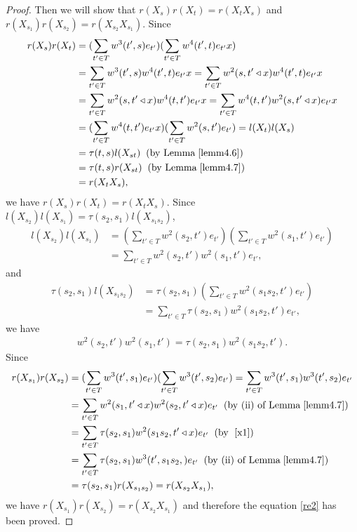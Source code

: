 \documentclass[a4paper,11pt]{amsart}
\numberwithin{equation}{section}
\begin{document}
\begin{proof}
Then we will show that $r(X_s)r(X_t)=r(X_{t}X_{s})$ and $r(X_{s_1})r(X_{s_2})=r(X_{s_2}X_{s_1})$.
Since
\begin{align*}
r(X_s)r(X_t)&=(\sum_{t'\in T} w^3(t',s)e_{t'}) (\sum_{t'\in T} w^4(t',t)e_{t'}x)\\
&=\sum_{t'\in T} w^3(t',s) w^4(t',t) e_{t'}x
=\sum_{t'\in T} w^2(s,t'\triangleleft x)w^4(t',t) e_{t'}x\\
&=\sum_{t'\in T} w^2(s,t'\triangleleft x)w^4(t,t') e_{t'}x
=\sum_{t'\in T} w^4(t,t')w^2(s,t'\triangleleft x) e_{t'}x\\
&=(\sum_{t'\in T} w^4(t,t') e_{t'}x) (\sum_{t'\in T}w^2(s,t') e_{t'})
=l(X_t)l(X_s)\\
&=\tau(t,s)l(X_{st}) \;\;(\text{by Lemma}\;\ref{lemm4.6})\\
&=\tau(t,s)r(X_{st})\;\;(\text{by Lemma}\;\ref{lemm4.7})\\
&=r(X_{t} X_{s}),
\end{align*}
we have $r(X_s)r(X_t)=r(X_{t}X_{s})$. Since $l(X_{s_2}) l(X_{s_1})=\tau(s_2,s_1)l(X_{s_1 s_2})$,
\begin{align*}
l(X_{s_2}) l(X_{s_1})&=(\sum_{t'\in T} w^2(s_2,t')e_{t'}) (\sum_{t'\in T} w^2(s_1,t')e_{t'})\\
&=\sum_{t'\in T} w^2(s_2,t') w^2(s_1,t') e_{t'},
\end{align*}
and
\begin{align*}
\tau(s_2,s_1)l(X_{s_1 s_2})&=\tau(s_2,s_1)(\sum_{t'\in T} w^2(s_1 s_2,t')e_{t'})\\
&=\sum_{t'\in T} \tau(s_2,s_1) w^2(s_1 s_2,t')e_{t'},
\end{align*}
we have
\begin{align}
\label{x1} w^2(s_2,t') w^2(s_1,t')=\tau(s_2,s_1) w^2(s_1 s_2,t').
\end{align}
Since
\begin{align*}
r(X_{s_1}) r(X_{s_2})&=(\sum_{t'\in T} w^3(t',s_1)e_{t'}) (\sum_{t'\in T} w^3(t',s_2)e_{t'})=\sum_{t'\in T} w^3(t',s_1) w^3(t',s_2) e_{t'}\\
&=\sum_{t'\in T} w^2(s_1,t'\triangleleft x) w^2(s_2,t'\triangleleft x) e_{t'} \;\;(\text{by (ii) of Lemma}\;\ref{lemm4.7})\\
&=\sum_{t'\in T} \tau(s_2,s_1) w^2(s_1 s_2,t'\triangleleft x) e_{t'}\;\;(\text{by }\;\eqref{x1})\\
&=\sum_{t'\in T} \tau(s_2,s_1) w^3(t',s_1 s_2,) e_{t'} \;\;(\text{by (ii) of Lemma}\;\ref{lemm4.7})\\
&=\tau(s_2,s_1)r(X_{s_1 s_2})=r(X_{s_2} X_{s_1}),
\end{align*}
we have $r(X_{s_1}) r(X_{s_2})=r(X_{s_2} X_{s_1})$ and therefore the equation \eqref{re2} has been proved.


\end{proof}
\end{document}
